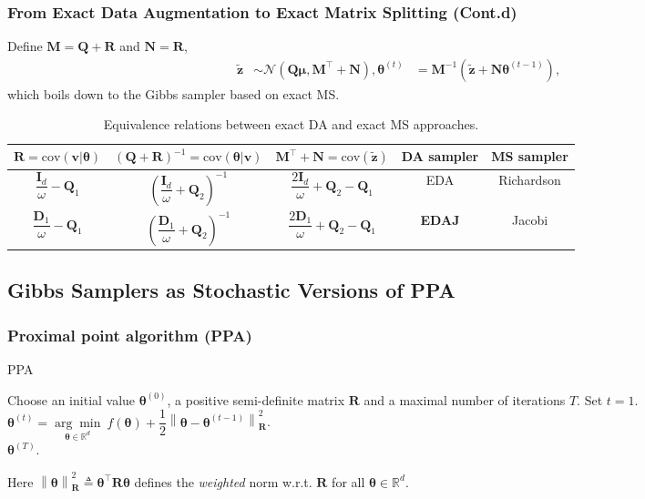 \documentclass[aspectratio=169]{beamer}
\newcommand{\B}[1]{\mathbf{#1}} %
\newcommand{\Bs}[1]{\boldsymbol{#1}} %
\newcommand{\pr}[1]{\left(#1\right)} %
\newcommand{\nr}[1]{\left\|#1\right\|} %
\begin{document}
\begin{frame}
  \frametitle{From Exact Data Augmentation to Exact Matrix Splitting (Cont.d)}
  Define $\B{M} = \B{Q}+\B{R}$ and $\B{N} = \B{R}$, 
  \[
    \begin{aligned}
      \tilde{\B{z}} & \sim  \mathcal{N}\pr{\B{Q}\Bs{\mu}, \B{M}^{\top} + \B{N}},
      \Bs{\theta}^{(t)} & =  \B{M}^{-1}\pr{\tilde{\B{z}} + \B{N}\Bs{\theta}^{(t-1)}},
    \end{aligned} 
    \]
  which boils down to the Gibbs sampler based on exact MS.
  
\begin{table}
{\footnotesize
  \caption{Equivalence relations between exact DA and exact MS approaches.} 
  \begin{center}
    {\renewcommand{\arraystretch}{1.5}
    \begin{tabular}{|c|c|c|c|c|} 
      \hline
      $\B{R}=\mathrm{cov}(\B{v}|\Bs{\theta})$ 
      & $(\B{Q} + \B{R})^{-1}=\mathrm{cov}(\Bs{\theta}|\B{v})$ 
      & $\B{M}^{\top} + \B{N}=\mathrm{cov}(\tilde{\B{z}})$ 
      & DA sampler & MS sampler \\
      \hline 
      $\dfrac{\B{I}_d}{\omega} - \B{Q}_1$ 
      & $\pr{\dfrac{\B{I}_d}{\omega} + \B{Q}_2}^{-1}$ 
      & $\dfrac{2\B{I}_d}{\omega} + \B{Q}_2 - \B{Q}_1$ 
      & EDA& Richardson  \\
      $\dfrac{\B{D}_1}{\omega} - \B{Q}_1$ 
      & $\pr{\dfrac{\B{D}_1}{\omega} + \B{Q}_2}^{-1}$ 
      & $\dfrac{2\B{D}_1}{\omega} + \B{Q}_2 - \B{Q}_1$ 
      & {\bf EDAJ} & Jacobi\\[1em]
      \hline
    \end{tabular}}
  \end{center}
}
\end{table}
\end{frame}

\subsection{Gibbs Samplers as Stochastic Versions of PPA}
\begin{frame}
\frametitle{Proximal point algorithm (PPA)}
\begin{algorithm}[H]
\caption{PPA}
\begin{algorithmic}[1]
\State Choose an initial value $\Bs{\theta}^{(0)}$, a positive semi-definite matrix $\B{R}$ and a maximal number of iterations $T$.
\State Set $t=1$.
\State $\Bs{\theta}^{(t)} = \underset{\Bs{\theta}\in\mathbb{R}^d}{\arg \min}\ f(\Bs{\theta}) + \dfrac{1}{2}\nr{\Bs{\theta}-\Bs{\theta}^{(t-1)}}_{\B{R}}^2$.
\EndWhile\\
\Return $\Bs{\theta}^{(T)}$.
\end{algorithmic}
\end{algorithm}
Here \(\nr{\Bs{\theta}}_{\B{R}}^2 \triangleq {\Bs{\theta}^{\top}\B{R}\Bs{\theta}}\) defines the \textit{weighted} norm w.r.t. $\B{R}$ for all $\Bs{\theta} \in \mathbb{R}^d$.

\end{frame}
\end{document}
